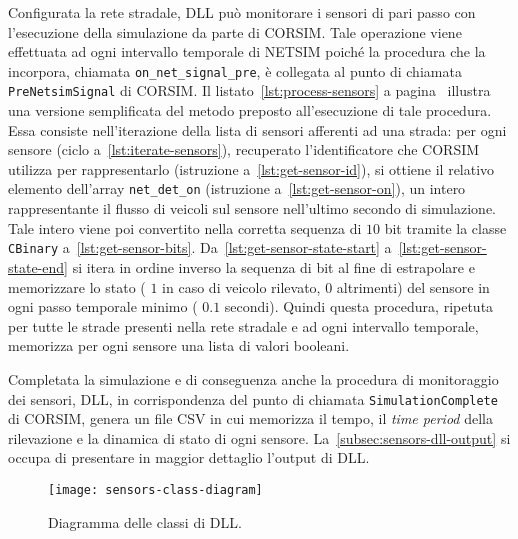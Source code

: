 Configurata la rete stradale,  \acs{DLL} può monitorare i sensori di pari passo con l'esecuzione della simulazione da parte di \acs{CORSIM}. Tale operazione viene effettuata ad ogni intervallo temporale di \acs{NETSIM} poiché la procedura che la incorpora, chiamata \lstinline[]|on_net_signal_pre|, è collegata al punto di chiamata \lstinline[]|PreNetsimSignal| di \acs{CORSIM}. Il listato~\ref{lst:process-sensors} a pagina~\pageref{lst:process-sensors} illustra una versione semplificata del metodo \CC{} preposto all'esecuzione di tale procedura. Essa consiste nell'iterazione della lista di sensori afferenti ad una strada: per ogni sensore (ciclo a~\autoref{lst:iterate-sensors}), recuperato l'identificatore che \acs{CORSIM} utilizza per rappresentarlo (istruzione a~\autoref{lst:get-sensor-id}), si ottiene il relativo elemento dell'array \lstinline[]|net_det_on| (istruzione a~\autoref{lst:get-sensor-on}), un intero rappresentante il flusso di veicoli sul sensore nell'ultimo secondo di simulazione. Tale intero viene poi convertito nella corretta sequenza di $10$ bit tramite la classe \lstinline[]|CBinary| a~\autoref{lst:get-sensor-bits}. Da~\autoref{lst:get-sensor-state-start} a~\autoref{lst:get-sensor-state-end} si itera in ordine inverso la sequenza di bit al fine di estrapolare e memorizzare lo stato (\ie{} $1$ in caso di veicolo rilevato, $0$ altrimenti) del sensore in ogni passo temporale minimo (\ie{} $0.1$ secondi). Quindi questa procedura, ripetuta per tutte le strade presenti nella rete stradale e ad ogni intervallo temporale, memorizza per ogni sensore una lista di valori booleani.

Completata la simulazione e di conseguenza anche la procedura di monitoraggio dei sensori,  \acs{DLL}, in corrispondenza del punto di chiamata \lstinline[]|SimulationComplete| di \acs{CORSIM}, genera un file \acs{CSV} in cui memorizza il tempo, il \emph{time period} della rilevazione e la dinamica di stato di ogni sensore. La~\autoref{subsec:sensors-dll-output}  si occupa di presentare in maggior dettaglio l'output di  \acs{DLL}.

\vspace*{8pt}

\begin{figure}[H]
    \centering
    \texttt{[image: sensors-class-diagram]}
    \caption[Diagramma delle classi di  \acs{DLL}]{Diagramma delle classi di  \acs{DLL}.}
    \label{fig:sensors-class-diagram}
\end{figure}

